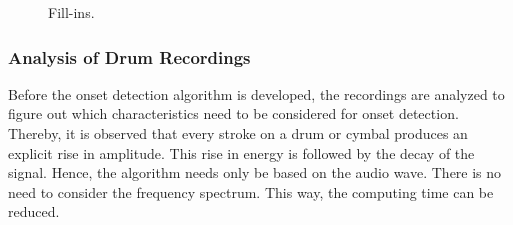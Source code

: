 \begin{figure}[h]
	\centering
	\qquad
	\caption{Fill-ins.}
	\label{fig:recordings4}
\end{figure}

\subsubsection{Analysis of Drum Recordings}

Before the onset detection algorithm is developed, the recordings are analyzed to figure out which characteristics need to be considered for onset detection. Thereby, it is observed that every stroke on a drum or cymbal produces an explicit rise in amplitude. This rise in energy is followed by the decay of the signal. Hence, the algorithm needs only be based on the audio wave. There is no need to consider the frequency spectrum. This way, the computing time can be reduced. 

